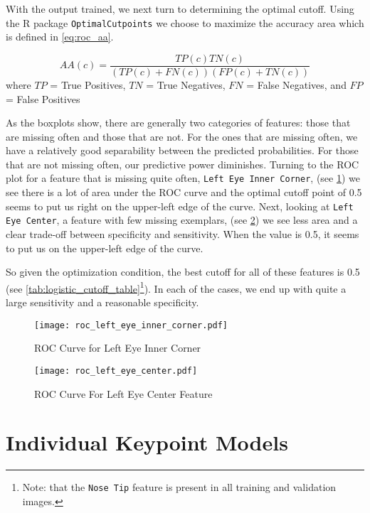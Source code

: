 \documentclass{article}
\begin{document}
With the output trained, we next turn to determining the optimal cutoff.  Using the R package \texttt{OptimalCutpoints} we choose to maximize the accuracy area \cite[lewis2008use,greiner1995two,greiner1996two]{} which is defined in \ref{eq:roc_aa}.

\[\label{eq:roc_aa}
AA(c)=\frac{TP(c)TN(c)}{(TP(c)+FN(c))(FP(c)+TN(c))}
\]
where $TP$ = True Positives, $TN$ = True Negatives, $FN$ = False Negatives, and $FP$ = False Positives

As the boxplots show, there are generally two categories of features: those that are missing often and those that are not. For the ones that are missing often, we have a relatively good separability between the predicted probabilities. For those that are not missing often, our predictive power diminishes. Turning to the ROC plot for a feature that is missing quite often, \texttt{Left Eye Inner Corner}, (see \ref{fig:roc_left_eye_inner_corner}) we see there is a lot of area under the ROC curve and the optimal cutoff point of 0.5 seems to put us right on the upper-left edge of the curve.  Next, looking at \texttt{Left Eye Center}, a feature with few missing exemplars, (see \ref{fig:roc_left_eye_center}) we see less area and a clear trade-off between specificity and sensitivity. When the value is 0.5, it seems to put us on the upper-left edge of the curve.

So given the optimization condition, the best cutoff for all of these features is 0.5 (see \ref{tab:logistic_cutoff_table}\footnote{Note: that the \texttt{Nose Tip} feature is present in all training and validation images.}).  In each of the cases, we end up with quite a large sensitivity and a reasonable specificity.

\begin{figure}[!htb]
  \centering
  \caption{ROC Curve for Left Eye Inner Corner}
  \texttt{[image: roc\_left\_eye\_inner\_corner.pdf]}
  \label{fig:roc_left_eye_inner_corner}
\end{figure}

\begin{figure}[!htb]
  \centering
  \caption{ROC Curve For Left Eye Center Feature}
  \texttt{[image: roc\_left\_eye\_center.pdf]}
  \label{fig:roc_left_eye_center}
\end{figure}




\section{Individual Keypoint Models}\label{neural}
\end{document}
